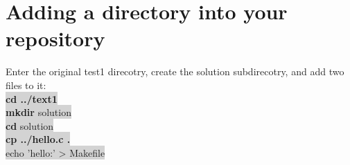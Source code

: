 \documentclass{article}
\begin{document}
  \section{\bf Adding a directory into your repository}
  Enter the original test1 direcotry, create the solution subdirecotry, and add two files to it:\\
  \colorbox{lightgray}{
	  \bf cd ../text1
  }\\
   \colorbox{lightgray}{
	   \textbf{mkdir} solution
  }\\
   \colorbox{lightgray}{
	   \textbf{cd} solution
  }\\
   \colorbox{lightgray}{
	   \bf cp ../hello.c .
  }\\
   \colorbox{lightgray}{
	   echo 'hello:' > Makefile 
  }\\
  
\end{document}
